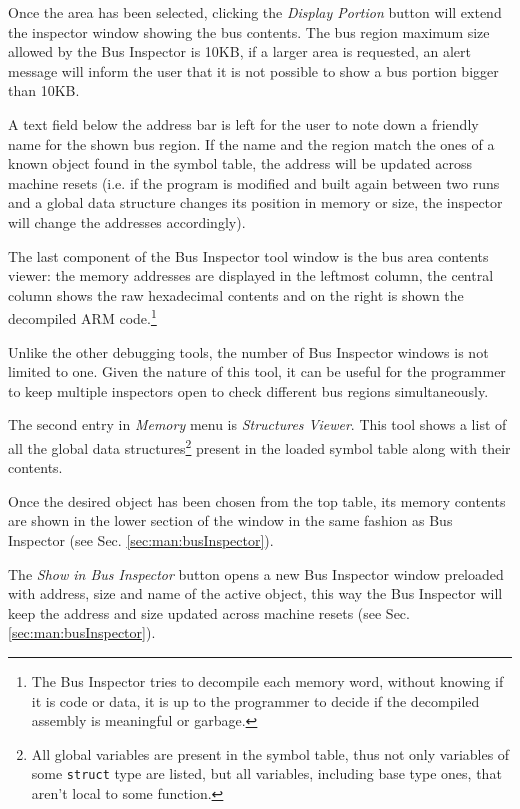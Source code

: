 Once the area has been selected, clicking the \emph{Display Portion} button will extend the inspector window showing the bus contents.
The bus region maximum size allowed by the Bus Inspector is 10KB, if a larger area is requested, an alert message will inform the user that it is not possible to show a bus portion bigger than 10KB.

A text field below the address bar is left for the user to note down a friendly name for the shown bus region.
If the name and the region match the ones of a known object found in the symbol table, the address will be updated across machine resets (i.e. if the program is modified and built again between two runs and a global data structure changes its position in memory or size, the inspector will change the addresses accordingly).

The last component of the Bus Inspector tool window is the bus area contents viewer: the memory addresses are displayed in the leftmost column, the central column shows the raw hexadecimal contents and on the right is shown the decompiled ARM code.\footnote{The Bus Inspector tries to decompile each memory word, without knowing if it is code or data, it is up to the programmer to decide if the decompiled assembly is meaningful or garbage.}

Unlike the other debugging tools, the number of Bus Inspector windows is not limited to one.
Given the nature of this tool, it can be useful for the programmer to keep multiple inspectors open to check different bus regions simultaneously.


The second entry in \emph{Memory} menu is \emph{Structures Viewer}.
This tool shows a list of all the global data structures\footnote{All global variables are present in the symbol table, thus not only variables of some \texttt{struct} type are listed, but all variables, including base type ones, that aren't local to some function.} present in the loaded symbol table along with their contents.

Once the desired object has been chosen from the top table, its memory contents are shown in the lower section of the window in the same fashion as Bus Inspector (see Sec. \ref{sec:man:busInspector}).

The \emph{Show in Bus Inspector} button opens a new Bus Inspector window preloaded with address, size and name of the active object, this way the Bus Inspector will keep the address and size updated across machine resets (see Sec. \ref{sec:man:busInspector}).

